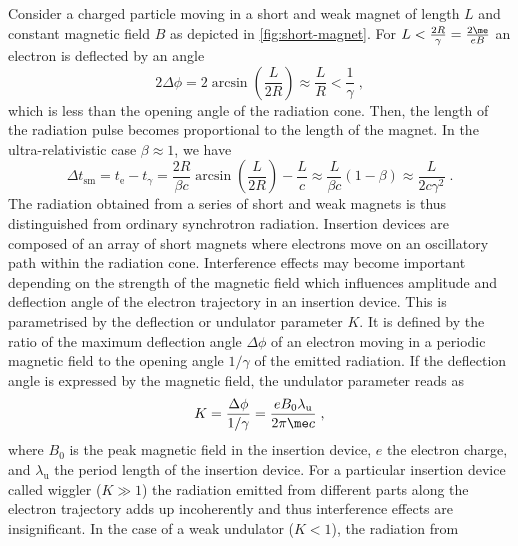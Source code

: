 \documentclass[
twoside,
openright,
titlepage,
numbers=noenddot,
headinclude,
fleqn,
a4paper,
footinclude=true,
cleardoublepage=empty,
abstractoff,
BCOR=5mm,
paper=a4,
fontsize=11pt,
british,ngerman,american,
]{scrreprt}
\begin{document}
Consider a charged particle moving in a short and weak magnet of
length $L$ and constant magnetic field $B$ as depicted in
\cref{fig:short-magnet}.  For $L < \frac{2R}{\gamma}=\frac{2
  \me}{e B}$ an electron is deflected by an angle
\begin{equation}
  \label{eq:short-magnet-angle}
  2 \Delta\phi
  =2\arcsin\left(\frac{L}{2R}\right)
  \approx\frac{L}{R}<\frac{1}{\gamma}\;,
\end{equation}
which is less than the opening angle of the radiation cone. Then, the
length of the radiation pulse becomes proportional to the length of
the magnet.  In the ultra-relativistic case $\beta\approx 1$, we have
\begin{equation}
  \label{eq:short-magnet-pulse}
  \Delta t_{\mathrm{sm}} = t_{\mathrm{e}}-t_\gamma = 
  \frac{2R}{\beta c} \arcsin\left(\frac{L}{2R}\right) -\frac{L}{c}
  \approx\frac{L}{\beta c}(1-\beta)
  \approx\frac{L}{2c\gamma^2}\;.
\end{equation}
The radiation obtained from a series of short and weak magnets is thus
distinguished from ordinary synchrotron radiation.  Insertion devices
are composed of an array of short magnets where electrons move on an
oscillatory path within the radiation cone.  Interference effects may
become important depending on the strength of the magnetic field which
influences amplitude and deflection angle of the electron trajectory
in an insertion device.  This is parametrised by the deflection or
undulator parameter $K$.  It is defined by the ratio of the maximum
deflection angle $\Delta \phi$ of an electron moving in a periodic
magnetic field to the opening angle $1/\gamma$ of the emitted
radiation. If the deflection angle is expressed by the magnetic field,
the undulator parameter reads as
\begin{equation}
  \label{eq:defl}
   K= \frac{\Delta \phi}{1/\gamma}
   =\frac{e B_0\lambda_{\mathrm{u}}}{2\pi \me c}\;,
\end{equation}
where $B_0$ is the peak magnetic field in the insertion device, $e$
the electron charge, and $\lambda_{\mathrm{u}}$
the period length of the insertion device. For a particular insertion
device called wiggler ($K\gg 1$) the radiation emitted from different
parts along the electron trajectory adds up incoherently and thus
interference effects are insignificant.
In the case of a weak undulator ($K < 1$), the radiation from
\end{document}
